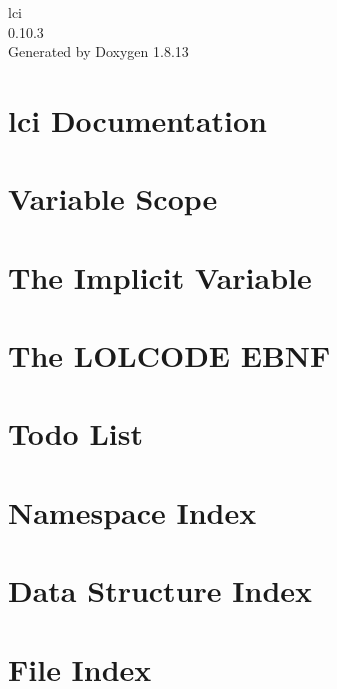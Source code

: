 \documentclass[twoside]{book}
\newcommand{\+}{\discretionary{\mbox{\scriptsize$\hookleftarrow$}}{}{}}
\newcommand{\clearemptydoublepage}{%
  \newpage{\pagestyle{empty}\cleardoublepage}%
}
\begin{document}
\hypersetup{pageanchor=false,
             bookmarksnumbered=true,
             pdfencoding=unicode
            }
\begin{titlepage}
\vspace*{7cm}
\begin{center}%
{\Large lci \\[1ex]\large 0.\+10.\+3 }\\
\vspace*{1cm}
{\large Generated by Doxygen 1.8.13}\\
\end{center}
\end{titlepage}
\clearemptydoublepage
{}
\tableofcontents
\clearemptydoublepage
{}
\hypersetup{pageanchor=true}

\chapter{lci Documentation}
\label{index}\hypertarget{index}{}
\chapter{Variable Scope}
\label{varscope}

\chapter{The Implicit Variable}
\label{impvar}

\chapter{The L\+O\+L\+C\+O\+DE E\+B\+NF}
\label{lolebnf}

\chapter{Todo List}
\label{todo}

\chapter{Namespace Index}

\chapter{Data Structure Index}

\chapter{File Index}

\end{document}
